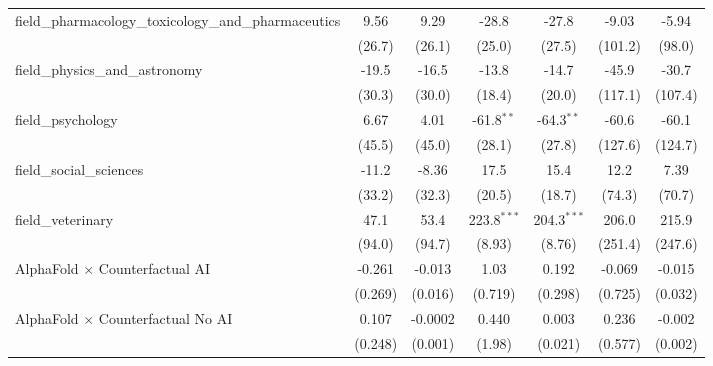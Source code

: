 \begin{tabular}{lcccccc}
   field\_pharmacology\_toxicology\_and\_pharmaceutics         & 9.56         & 9.29         & -28.8          & -27.8          & -9.03   & -5.94\\   
                                                               & (26.7)       & (26.1)       & (25.0)         & (27.5)         & (101.2) & (98.0)\\   
   field\_physics\_and\_astronomy                              & -19.5        & -16.5        & -13.8          & -14.7          & -45.9   & -30.7\\   
                                                               & (30.3)       & (30.0)       & (18.4)         & (20.0)         & (117.1) & (107.4)\\   
   field\_psychology                                           & 6.67         & 4.01         & -61.8$^{**}$   & -64.3$^{**}$   & -60.6   & -60.1\\   
                                                               & (45.5)       & (45.0)       & (28.1)         & (27.8)         & (127.6) & (124.7)\\   
   field\_social\_sciences                                     & -11.2        & -8.36        & 17.5           & 15.4           & 12.2    & 7.39\\   
                                                               & (33.2)       & (32.3)       & (20.5)         & (18.7)         & (74.3)  & (70.7)\\   
   field\_veterinary                                           & 47.1         & 53.4         & 223.8$^{***}$  & 204.3$^{***}$  & 206.0   & 215.9\\   
                                                               & (94.0)       & (94.7)       & (8.93)         & (8.76)         & (251.4) & (247.6)\\   
   AlphaFold $\times$ Counterfactual AI                        & -0.261       & -0.013       & 1.03           & 0.192          & -0.069  & -0.015\\   
                                                               & (0.269)      & (0.016)      & (0.719)        & (0.298)        & (0.725) & (0.032)\\   
   AlphaFold $\times$ Counterfactual No AI                     & 0.107        & -0.0002      & 0.440          & 0.003          & 0.236   & -0.002\\   
                                                               & (0.248)      & (0.001)      & (1.98)         & (0.021)        & (0.577) & (0.002)\\   

\end{tabular}
